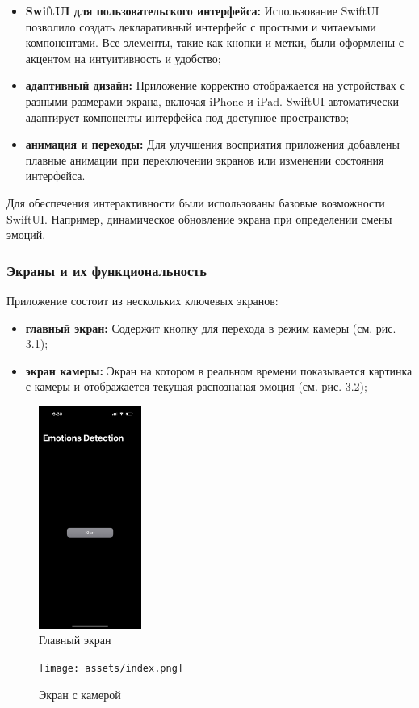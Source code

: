 {{    \begin{itemize}
        \item \textbf{SwiftUI для пользовательского интерфейса:} Использование SwiftUI позволило создать декларативный интерфейс с простыми и читаемыми компонентами. Все элементы, такие как кнопки и метки, были оформлены с акцентом на интуитивность и удобство;
        \item \textbf{адаптивный дизайн:} Приложение корректно отображается на устройствах с разными размерами экрана, включая iPhone и iPad. SwiftUI автоматически адаптирует компоненты интерфейса под доступное пространство;
        \item \textbf{анимация и переходы:} Для улучшения восприятия приложения добавлены плавные анимации при переключении экранов или изменении состояния интерфейса.
    \end{itemize}
    
    Для обеспечения интерактивности были использованы базовые возможности SwiftUI. Например, динамическое обновление экрана при определении смены эмоций.
    
    \subsubsection*{Экраны и их функциональность}
    
    Приложение состоит из нескольких ключевых экранов:
    
    \begin{itemize}
        \item \textbf{главный экран:} Содержит кнопку для перехода в режим камеры (см. рис. 3.1);
        \item \textbf{экран камеры:} Экран на котором в реальном времени показывается картинка с камеры и отображается текущая распознаная эмоция (см. рис. 3.2);
    \end{itemize}
    \begin{figure}[H]
        \centering
        \includegraphics[width=0.3\textwidth]{assets/registration.png} 
        \caption{Главный экран}
    \end{figure}
    \begin{figure}[H]
        \centering
        \texttt{[image: assets/index.png]} 
        \caption{Экран с камерой}
    \end{figure}
    
}}
